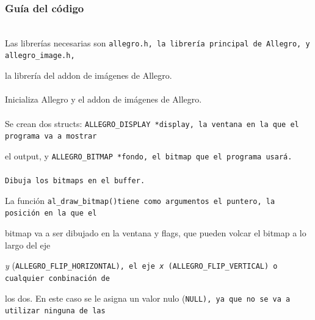 \documentclass[11pt]{article}
\begin{document}
\subsubsection{Guía del código}

\\

Las librerías necesarias son \tt allegro.h\rm , la librería principal de Allegro, y \tt allegro\_image.h\rm ,

la librería del addon de imágenes de Allegro.\\

\\

Inicializa Allegro y el addon de imágenes de Allegro.\\

\\

Se crean dos structs: \tt ALLEGRO\_DISPLAY *display\rm , la ventana en la que el programa va a mostrar

el output, y \tt ALLEGRO\_BITMAP *fondo\rm , el bitmap que el programa usará.\\

\\

Dibuja los bitmaps en el buffer.

La función \tt al\_draw\_bitmap()\rm  tiene como argumentos el puntero, la posición en la que el

bitmap va a ser dibujado en la ventana y flags, que pueden volcar el bitmap a lo largo del eje

\emph{y} (\tt ALLEGRO\_FLIP\_HORIZONTAL\rm), el eje \emph{x} (\tt ALLEGRO\_FLIP\_VERTICAL\rm) o cualquier conbinación de

los dos. En este caso se le asigna un valor nulo (\tt NULL\rm ), ya que no se va a utilizar ninguna de las
\end{document}
